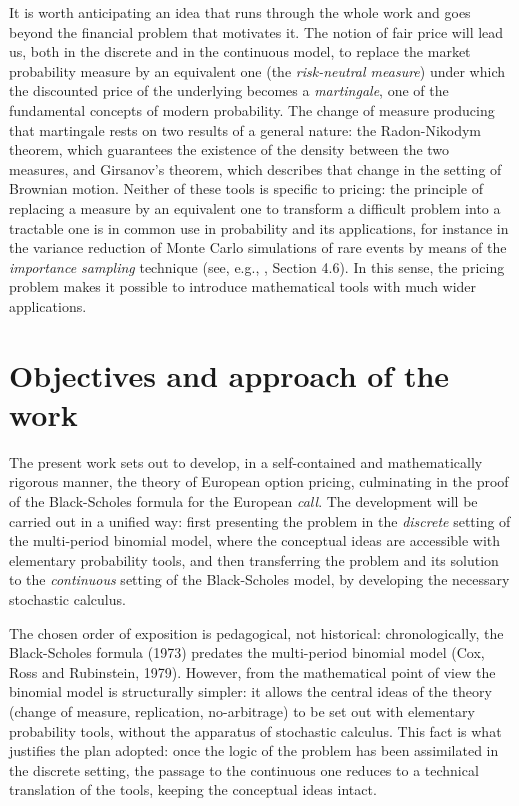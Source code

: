 \documentclass[11pt,a4paper,oneside]{report}
\theoremstyle{plain}
\theoremstyle{definition}
\theoremstyle{remark}
\newcommand{\1}{\mathbf{1}}
\begin{document}
It is worth
anticipating an idea that runs through the whole work and goes
beyond the financial problem that motivates it. The notion of fair
price will lead us, both in the discrete and in the continuous model,
to replace the market probability measure by an equivalent one (the
\emph{risk-neutral measure}) under which the discounted price of the
underlying becomes a \emph{martingale}, one of the fundamental
concepts of modern probability. The change of measure producing that
martingale rests on two results of a general nature: the
Radon-Nikodym theorem, which guarantees the existence of the density
between the two measures, and Girsanov's theorem, which describes
that change in the setting of Brownian motion. Neither of these tools
is specific to pricing: the principle of replacing a measure by an
equivalent one to transform a difficult problem into a tractable one
is in common use in probability and its applications, for instance
in the variance reduction of Monte Carlo simulations of rare events
by means of the \emph{importance sampling} technique (see, e.g.,
\cite{glasserman}, Section 4.6). In this sense, the pricing problem makes it
possible to introduce mathematical tools with much wider
applications.

\section{Objectives and approach of the work}
\label{sec:objetivos}

The present work sets out to develop, in a self-contained and
mathematically rigorous manner, the theory of European option
pricing, culminating in the proof of the Black-Scholes formula for
the European \emph{call}. The development will be carried out in a
unified way: first presenting the problem in the \emph{discrete}
setting of the multi-period binomial model, where the conceptual
ideas are accessible with elementary probability tools, and then
transferring the problem and its solution to the \emph{continuous}
setting of the Black-Scholes model, by developing the necessary
stochastic calculus.

The chosen order of exposition is pedagogical, not historical:
chronologically, the Black-Scholes formula (1973) predates the
multi-period binomial model (Cox, Ross and Rubinstein, 1979).
However, from the mathematical point of view the binomial model is
structurally simpler: it allows the central ideas of the theory
(change of measure, replication, no-arbitrage) to be set out with
elementary probability tools, without the apparatus of stochastic
calculus. This fact is what justifies the plan adopted: once the
logic of the problem has been assimilated in the discrete setting,
the passage to the continuous one reduces to a technical translation
of the tools, keeping the conceptual ideas intact.
\end{document}
